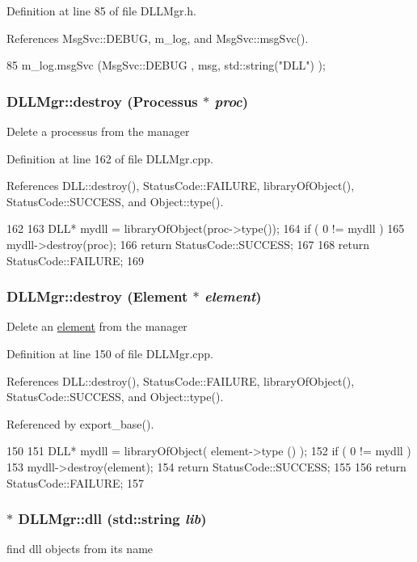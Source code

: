 Definition at line 85 of file DLLMgr.h.

References MsgSvc::DEBUG, m\_\-log, and MsgSvc::msgSvc().


\begin{DoxyCode}
85 { m_log.msgSvc (MsgSvc::DEBUG   , msg, std::string("DLL") ); }
\end{DoxyCode}
\hypertarget{classDLLMgr_a8f0923cc39c9f73d272f38bcbcf7ca18}{
\subsubsection[{destroy}]{ DLLMgr::destroy ({\bf Processus} $\ast$ {\em proc})}}
\label{classDLLMgr_a8f0923cc39c9f73d272f38bcbcf7ca18}
Delete a processus from the manager 

Definition at line 162 of file DLLMgr.cpp.

References DLL::destroy(), StatusCode::FAILURE, libraryOfObject(), StatusCode::SUCCESS, and Object::type().


\begin{DoxyCode}
162                                              {
163   DLL* mydll = libraryOfObject(proc->type());
164   if ( 0 != mydll ) {
165     mydll->destroy(proc);
166     return StatusCode::SUCCESS;
167   }
168   return StatusCode::FAILURE;
169 }
\end{DoxyCode}
\hypertarget{classDLLMgr_abc9c97bab16c8f261626ed401d67c8c8}{
\subsubsection[{destroy}]{ DLLMgr::destroy ({\bf Element} $\ast$ {\em element})}}
\label{classDLLMgr_abc9c97bab16c8f261626ed401d67c8c8}
Delete an \hyperlink{namespaceelement}{element} from the manager 

Definition at line 150 of file DLLMgr.cpp.

References DLL::destroy(), StatusCode::FAILURE, libraryOfObject(), StatusCode::SUCCESS, and Object::type().

Referenced by export\_\-base().


\begin{DoxyCode}
150                                               {
151   DLL* mydll = libraryOfObject( element->type () );
152   if ( 0 != mydll ) {
153     mydll->destroy(element);
154     return StatusCode::SUCCESS;
155   }
156   return StatusCode::FAILURE;
157 }
\end{DoxyCode}
\hypertarget{classDLLMgr_a0241372eb2e136f61e609a04426636bd}{
\subsubsection[{dll}]{ $\ast$ DLLMgr::dll (std::string {\em lib})}}
\label{classDLLMgr_a0241372eb2e136f61e609a04426636bd}
find dll objects from its name 

